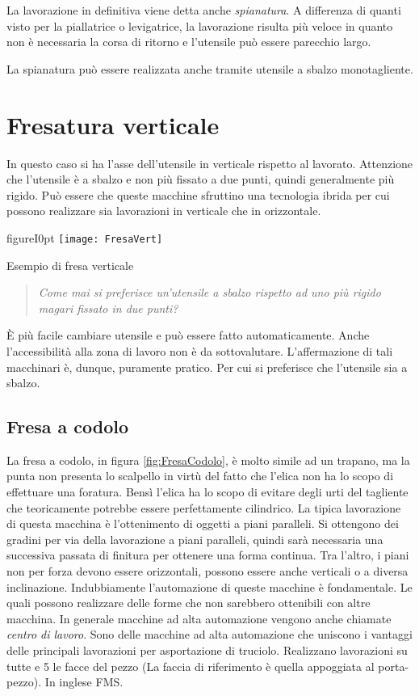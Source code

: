 La lavorazione in definitiva viene detta anche \emph{spianatura}. 
A differenza di quanti visto per la piallatrice o levigatrice, la lavorazione risulta più veloce in quanto non è necessaria la corsa di ritorno e l'utensile può essere parecchio largo.

La spianatura può essere realizzata anche tramite utensile a sbalzo monotagliente.

\section{Fresatura verticale}
In questo caso si ha l'asse dell'utensile in verticale rispetto al lavorato. 
Attenzione che l'utensile è a sbalzo e non più fissato a due punti, quindi generalmente più rigido.
Può essere che queste macchine sfruttino una tecnologia ibrida per cui possono realizzare sia lavorazioni
in verticale che in orizzontale.
\begin{wrapfloat}{figure}{I}{0pt}
\texttt{[image: FresaVert]}
\caption{Esempio di fresa verticale}
\label{fig:FresaVert}
\end{wrapfloat}

\begin{quote}
\emph{Come mai si preferisce un'utensile a sbalzo rispetto ad uno più rigido magari fissato in due punti?}
\end{quote}

È più facile cambiare utensile e può essere fatto automaticamente. Anche l'accessibilità alla zona di lavoro
non è da sottovalutare.
L'affermazione di tali macchinari è, dunque, puramente pratico.
Per cui si preferisce che l'utensile sia a sbalzo.

\subsection{Fresa a codolo}
La fresa a codolo, in figura \ref{fig:FresaCodolo}, è molto simile ad un trapano, ma la punta non presenta lo scalpello in virtù del fatto che l'elica non ha lo scopo di effettuare una foratura. Bensì l'elica ha lo scopo di evitare degli urti del tagliente che teoricamente potrebbe essere perfettamente cilindrico.
La tipica lavorazione di questa macchina è l'ottenimento di oggetti a piani paralleli.
Si ottengono dei gradini per via della lavorazione a piani paralleli, quindi sarà necessaria una successiva passata di finitura per ottenere una forma continua.
Tra l'altro, i piani non per forza devono essere orizzontali, possono essere anche verticali o a diversa inclinazione.
Indubbiamente l'automazione di queste macchine è fondamentale. Le quali possono realizzare delle forme che non sarebbero ottenibili con altre macchina.
In generale macchine ad alta automazione vengono anche chiamate \emph{centro di lavoro}.
Sono delle macchine ad alta automazione che uniscono i vantaggi delle principali lavorazioni per asportazione di truciolo.
Realizzano lavorazioni su tutte e 5 le facce del pezzo (La faccia di riferimento è quella appoggiata al porta-pezzo). In inglese \ac{FMS}.

